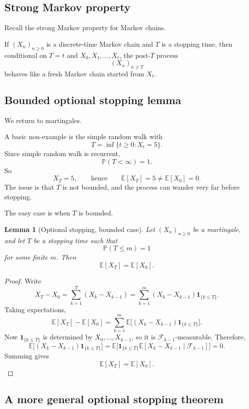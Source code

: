 \documentclass[11pt]{article}
\newtheorem{lemma}[theorem]{Lemma}
\theoremstyle{definition}
\begin{document}
\subsection{Strong Markov property}

Recall the strong Markov property for Markov chains.

If \((X_n)_{n\ge 0}\) is a discrete-time Markov chain and \(T\) is a stopping time, then conditional on \(T=t\) and \(X_0,X_1,\dots,X_t\), the post-\(T\) process
\[
(X_n)_{n\ge T}
\]
behaves like a fresh Markov chain started from \(X_t\).

\subsection{Bounded optional stopping lemma}

We return to martingales.

A basic non-example is the simple random walk with
\[
T=\inf\{t\ge 0:X_t=5\}.
\]
Since simple random walk is recurrent,
\[
\mathbb P(T<\infty)=1.
\]
So
\[
X_T=5,
\qquad\text{hence}\qquad
\mathbb E[X_T]=5\neq \mathbb E[X_0]=0.
\]
The issue is that \(T\) is not bounded, and the process can wander very far before stopping.

The easy case is when \(T\) is bounded.

\begin{lemma}[Optional stopping, bounded case]
Let \((X_n)_{n\ge 0}\) be a martingale, and let \(T\) be a stopping time such that
\[
\mathbb P(T\le m)=1
\]
for some finite \(m\). Then
\[
\mathbb E[X_T]=\mathbb E[X_0].
\]
\end{lemma}

\begin{proof}
Write
\[
X_T-X_0=\sum_{k=1}^T (X_k-X_{k-1})
=
\sum_{k=1}^m (X_k-X_{k-1})\mathbf 1_{\{k\le T\}}.
\]
Taking expectations,
\[
\mathbb E[X_T]-\mathbb E[X_0]
=
\sum_{k=1}^m \mathbb E\big[(X_k-X_{k-1})\mathbf 1_{\{k\le T\}}\big].
\]
Now \(\mathbf 1_{\{k\le T\}}\) is determined by \(X_0,\dots,X_{k-1}\), so it is \(\mathcal F_{k-1}\)-measurable. Therefore,
\[
\mathbb E\big[(X_k-X_{k-1})\mathbf 1_{\{k\le T\}}\big]
=
\mathbb E\Big[\mathbf 1_{\{k\le T\}}\mathbb E[X_k-X_{k-1}\mid \mathcal F_{k-1}]\Big]
=0.
\]
Summing gives
\[
\mathbb E[X_T]=\mathbb E[X_0].
\]
\end{proof}

\subsection{A more general optional stopping theorem}
\end{document}
